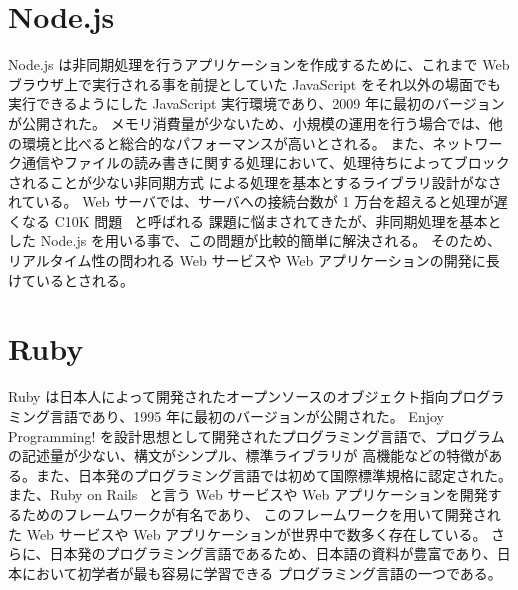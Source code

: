 \section{Node.js}
\label{cha:script-language:nodejs}

Node.js は非同期処理を行うアプリケーションを作成するために、これまで Web ブラウザ上で実行される事を前提としていた
JavaScript をそれ以外の場面でも実行できるようにした JavaScript 実行環境であり、2009 年に最初のバージョンが公開された。
メモリ消費量が少ないため、小規模の運用を行う場合では、他の環境と比べると総合的なパフォーマンスが高いとされる。
また、ネットワーク通信やファイルの読み書きに関する処理において、処理待ちによってブロックされることが少ない非同期方式
による処理を基本とするライブラリ設計がなされている。
Web サーバでは、サーバへの接続台数が 1 万台を超えると処理が遅くなる C10K 問題~\cite{C10k} と呼ばれる
課題に悩まされてきたが、非同期処理を基本とした Node.js を用いる事で、この問題が比較的簡単に解決される。
そのため、リアルタイム性の問われる Web サービスや Web アプリケーションの開発に長けているとされる。

\section{Ruby}
\label{cha:script-language:ruby}

Ruby は日本人によって開発されたオープンソースのオブジェクト指向プログラミング言語であり、1995 年に最初のバージョンが公開された。
Enjoy Programming! を設計思想として開発されたプログラミング言語で、プログラムの記述量が少ない、構文がシンプル、標準ライブラリが
高機能などの特徴がある。また、日本発のプログラミング言語では初めて国際標準規格に認定された。
また、Ruby on Rails~\cite{Rails} と言う Web サービスや Web アプリケーションを開発するためのフレームワークが有名であり、
このフレームワークを用いて開発された Web サービスや Web アプリケーションが世界中で数多く存在している。
さらに、日本発のプログラミング言語であるため、日本語の資料が豊富であり、日本において初学者が最も容易に学習できる
プログラミング言語の一つである。
